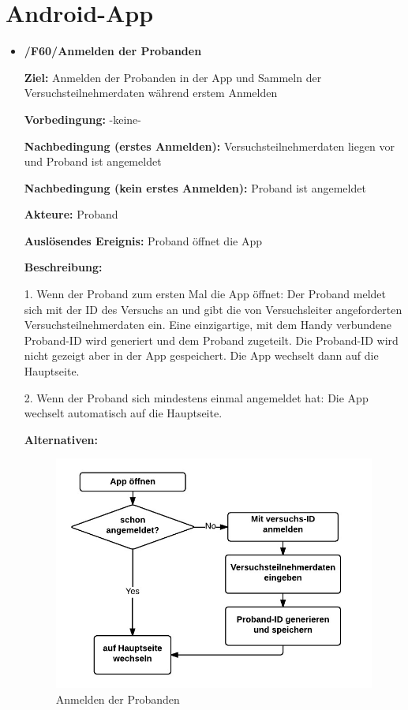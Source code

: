 \documentclass[a4paper]{scrreprt}
\begin{document}
    \newpage
    \section{Android-App}

        \begin{itemize}
            \item \textbf{/F60/Anmelden der Probanden}

				\par \textbf{Ziel: }Anmelden der Probanden in der App und Sammeln der Versuchsteilnehmerdaten während erstem Anmelden
				\par \textbf{Vorbedingung: }-keine-
				\par \textbf{Nachbedingung (erstes Anmelden): }Versuchsteilnehmerdaten liegen vor und Proband ist angemeldet
				\par \textbf{Nachbedingung (kein erstes Anmelden): }Proband ist angemeldet
				\par \textbf{Akteure: }Proband
				\par \textbf{Auslösendes Ereignis: }Proband öffnet die App
				\par \textbf{Beschreibung: }
				\par 1. Wenn der Proband zum ersten Mal die App öffnet: Der Proband meldet sich mit der ID des Versuchs an und gibt die
				 von Versuchsleiter angeforderten Versuchsteilnehmerdaten ein. Eine einzigartige, mit dem Handy verbundene Proband-ID wird generiert und dem Proband zugeteilt. Die Proband-ID wird nicht gezeigt aber in der App gespeichert. Die App wechselt dann auf die Hauptseite.
				\par 2. Wenn der Proband sich mindestens einmal angemeldet hat: Die App wechselt automatisch auf die Hauptseite.
				\par \textbf{Alternativen: }
				\begin{figure}[ht]
					\centering
					\includegraphics[scale=1]{AppAnmelden.jpeg}
					\caption{Anmelden der Probanden}
				\end{figure}
								


\end{itemize}
\end{document}
